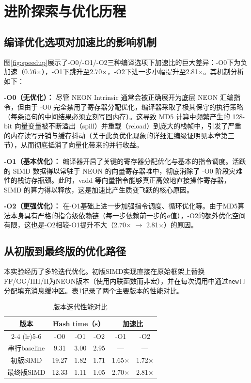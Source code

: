 \documentclass[UTF8,a4paper,10pt]{ctexart}
\begin{document}
\section{进阶探索与优化历程}
\label{sec:explore}

\subsection{编译优化选项对加速比的影响机制}

图\ref{fig:speedup}展示了-O0/-O1/-O2三种编译选项下加速比的巨大差异：-O0下为负加速（0.76$\times$），-O1下跳升至2.70$\times$，-O2下进一步小幅提升至2.81$\times$。其机制分析如下：

\noindent\textbf{-O0（无优化）：} 尽管 NEON Intrinsic 通常会被正确展开为底层 NEON 汇编指令，但由于 -O0 完全禁用了寄存器分配优化，编译器采取了极其保守的执行策略（每条语句的中间结果必须立刻写回内存）。这导致 MD5 计算中频繁产生的 128-bit 向量变量被不断溢出（spill）并重载（reload）到庞大的栈帧中，引发了严重的内存读写开销与缓存抖动（关于此负优化现象的详细汇编级证明见本章第三节），从而彻底抵消了向量化带来的并行收益。

\noindent\textbf{-O1（基本优化）：} 编译器开启了关键的寄存器分配优化与基本的指令调度。活跃的 SIMD 数据得以常驻于 NEON 的向量寄存器堆中，彻底消除了 -O0 阶段灾难性的栈访存瓶颈。此时，vadd 等向量指令能够真正高效地直接操作寄存器，SIMD 的算力得以释放，这是加速比产生质变飞跃的核心原因。

\noindent\textbf{-O2（更强优化）：} 在-O1基础上进一步加强指令调度、循环优化等。由于MD5算法本身具有严格的指令级依赖链（每一步依赖前一步的$a$值），-O2的额外优化空间有限，这也是-O2相较-O1提升不大（2.70$\times$ $\to$ 2.81$\times$）的原因。

\subsection{从初版到最终版的优化路径}

本实验经历了多轮迭代优化。初版SIMD实现直接在原始框架上替换FF/GG/HH/II为NEON版本（使用内联函数而非宏），并在每次调用中通过\lstinline{new[]}分配填充消息缓冲区。表\ref{tab:evolution}记录了两个主要版本的性能对比。

\begin{table}[!htbp]
  \centering
  \begin{tabular}{cccccc}
  \toprule
  \multirow{2}{*}{版本} & \multicolumn{3}{c}{Hash time（s）} & \multicolumn{2}{c}{加速比} \\
  \cmidrule(lr){2-4} \cmidrule(lr){5-6}
  & -O0 & -O1 & -O2 & -O1 & -O2 \\
  \midrule
  串行baseline & 9.31 & 3.00 & 2.95 & --- & --- \\
  初版SIMD & 19.27 & 1.82 & 1.71 & 1.65$\times$ & 1.72$\times$ \\
  最终版SIMD & 12.33 & 1.11 & 1.05 & 2.70$\times$ & 2.81$\times$ \\
  \bottomrule
  \end{tabular}
  \caption{版本迭代性能对比}
  \label{tab:evolution}
\end{table}
\end{document}
